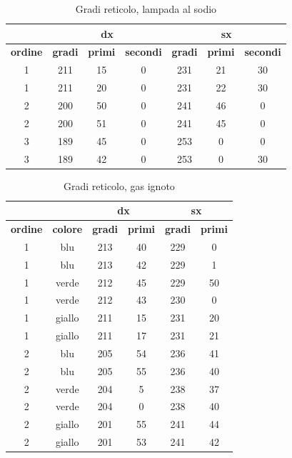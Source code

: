 \documentclass[letterpaper,12pt]{article}
\begin{document}
        \begin{table}[h!]
            \centering
            \begin{tabular}{|c|ccc|ccc|}
            \hline
            & \multicolumn{3}{|c|}{\textbf{dx}} & \multicolumn{3}{|c|}{\textbf{sx}} \\
            \hline
            \textbf{ordine} & \textbf{gradi} & \textbf{primi} & \textbf{secondi} & \textbf{gradi} & \textbf{primi} & \textbf{secondi} \\
            \hline
            1 & 211 & 15 & 0 & 231 & 21 & 30 \\
            1 & 211 & 20 & 0 & 231 & 22 & 30 \\
            2 & 200 & 50 & 0 & 241 & 46 & 0 \\
            2 & 200 & 51 & 0 & 241 & 45 & 0 \\
            3 & 189 & 45 & 0 & 253 & 0 & 0 \\
            3 & 189 & 42 & 0 & 253 & 0 & 30 \\
            \hline
            \end{tabular}
            \caption{Gradi reticolo, lampada al sodio}
            \label{tab:dati_reticolo_sodio}
            \end{table}


            \begin{table}[h!]
                \centering
                \begin{tabular}{|c|c|cc|cc|}
                \hline
                & & \multicolumn{2}{|c|}{\textbf{dx}} & \multicolumn{2}{|c|}{\textbf{sx}} \\
                \hline
                \textbf{ordine} & \textbf{colore} & \textbf{gradi} & \textbf{primi} & \textbf{gradi} & \textbf{primi} \\
                \hline
                1 & blu & 213 & 40 & 229 & 0 \\
                1 & blu & 213 & 42 & 229 & 1 \\
                1 & verde & 212 & 45 & 229 & 50 \\
                1 & verde & 212 & 43 & 230 & 0 \\
                1 & giallo & 211 & 15 & 231 & 20 \\
                1 & giallo & 211 & 17 & 231 & 21 \\
                2 & blu & 205 & 54 & 236 & 41 \\
                2 & blu & 205 & 55 & 236 & 40 \\
                2 & verde & 204 & 5 & 238 & 37 \\
                2 & verde & 204 & 0 & 238 & 40 \\
                2 & giallo & 201 & 55 & 241 & 44 \\
                2 & giallo & 201 & 53 & 241 & 42 \\
                \hline
                \end{tabular}
                \caption{Gradi reticolo, gas ignoto}
                \label{tab:dati_reticolo_ignoto}
                \end{table}
\end{document}
